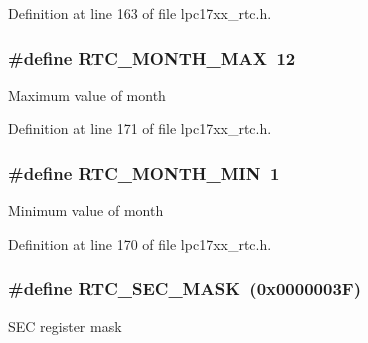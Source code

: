 \-Definition at line 163 of file lpc17xx\-\_\-rtc.\-h.

\hypertarget{group___r_t_c___private___macros_gacad40d1a94fd9b6884ec6160abb07674}{
\subsubsection[{\-R\-T\-C\-\_\-\-M\-O\-N\-T\-H\-\_\-\-M\-A\-X}]{\setlength{\rightskip}{0pt plus 5cm}\#define {\bf \-R\-T\-C\-\_\-\-M\-O\-N\-T\-H\-\_\-\-M\-A\-X}~12}}\label{group___r_t_c___private___macros_gacad40d1a94fd9b6884ec6160abb07674}
\-Maximum value of month 

\-Definition at line 171 of file lpc17xx\-\_\-rtc.\-h.

\hypertarget{group___r_t_c___private___macros_ga5002ab062a5871b7ed73c7ff0cb00e6b}{
\subsubsection[{\-R\-T\-C\-\_\-\-M\-O\-N\-T\-H\-\_\-\-M\-I\-N}]{\setlength{\rightskip}{0pt plus 5cm}\#define {\bf \-R\-T\-C\-\_\-\-M\-O\-N\-T\-H\-\_\-\-M\-I\-N}~1}}\label{group___r_t_c___private___macros_ga5002ab062a5871b7ed73c7ff0cb00e6b}
\-Minimum value of month 

\-Definition at line 170 of file lpc17xx\-\_\-rtc.\-h.

\hypertarget{group___r_t_c___private___macros_gabc478af38e7fa3018d8449f22c51d10e}{
\subsubsection[{\-R\-T\-C\-\_\-\-S\-E\-C\-\_\-\-M\-A\-S\-K}]{\setlength{\rightskip}{0pt plus 5cm}\#define {\bf \-R\-T\-C\-\_\-\-S\-E\-C\-\_\-\-M\-A\-S\-K}~(0x0000003\-F)}}\label{group___r_t_c___private___macros_gabc478af38e7fa3018d8449f22c51d10e}
\-S\-E\-C register mask 

